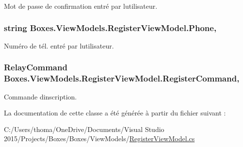 Mot de passe de confirmation entré par l\textquotesingle{}utilisateur. 

\subsubsection[{\texorpdfstring{Phone}{Phone}}]{\setlength{\rightskip}{0pt plus 5cm}string Boxes.\+View\+Models.\+Register\+View\+Model.\+Phone\hspace{0.3cm}{\ttfamily [get]}, {\ttfamily [set]}}\hypertarget{class_boxes_1_1_view_models_1_1_register_view_model_ad1f7bd5d2949698e68fae56f4b87980e}{}\label{class_boxes_1_1_view_models_1_1_register_view_model_ad1f7bd5d2949698e68fae56f4b87980e}


Numéro de tél. entré par l\textquotesingle{}utilisateur. 

\subsubsection[{\texorpdfstring{Register\+Command}{RegisterCommand}}]{\setlength{\rightskip}{0pt plus 5cm}Relay\+Command Boxes.\+View\+Models.\+Register\+View\+Model.\+Register\+Command\hspace{0.3cm}{\ttfamily [get]}, {}}\hypertarget{class_boxes_1_1_view_models_1_1_register_view_model_a21f0b17057452c9ac974122df5fdbc0e}{}\label{class_boxes_1_1_view_models_1_1_register_view_model_a21f0b17057452c9ac974122df5fdbc0e}


Commande d\textquotesingle{}inscription. 



La documentation de cette classe a été générée à partir du fichier suivant \+:\begin{DoxyCompactItemize}
\item 
C\+:/\+Users/thoma/\+One\+Drive/\+Documents/\+Visual Studio 2015/\+Projects/\+Boxes/\+Boxes/\+View\+Models/\hyperlink{_register_view_model_8cs}{Register\+View\+Model.\+cs}\end{DoxyCompactItemize}
